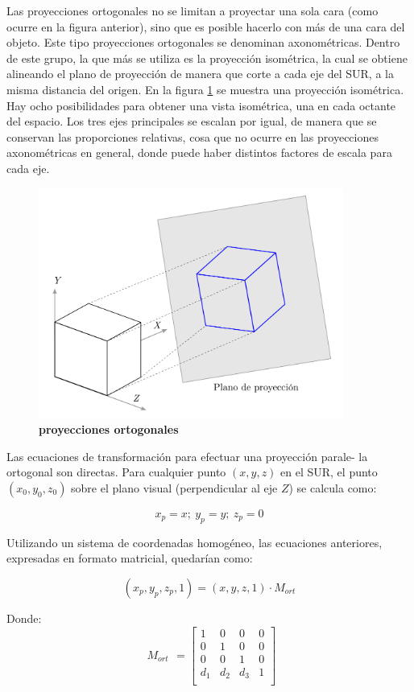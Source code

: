 Las proyecciones ortogonales no se limitan a proyectar una sola cara (como ocurre en la figura anterior), sino que es posible hacerlo con más de una cara del objeto. Este tipo proyecciones ortogonales se denominan axonométricas. Dentro de este grupo, la que más se utiliza es la proyección isométrica, la cual se obtiene alineando el plano de proyección de manera que corte a cada eje del SUR, a la misma distancia del origen. En la figura \ref{geo-per4} se muestra una proyección isométrica. Hay ocho posibilidades para obtener una vista isométrica, una en cada octante del espacio. Los tres ejes principales se escalan por igual, de manera que se conservan las proporciones relativas, cosa que no ocurre en las proyecciones axonométricas en general, donde puede haber distintos factores de escala para cada eje.
\begin{figure}[h]
    \includegraphics[width=10cm]{Img/GEO/geo-per-4.png}
    \centering
    \caption{\footnotesize{\textbf{proyecciones ortogonales}}}
    \label{geo-per4}
\end{figure}

Las ecuaciones de transformación para efectuar una proyección parale- la ortogonal son directas. Para cualquier punto $(x, y, z)$ en el SUR, el punto $(x_0, y_0, z_0)$ sobre el plano visual (perpendicular al eje $Z$) se calcula como:

$$x_p = x; \ y_p = y; \ z_p=0$$

Utilizando un sistema de coordenadas homogéneo, las ecuaciones anteriores, expresadas en formato matricial, quedarían como:

$$(x_p, y_p, z_p, 1)=(x, y, z, 1) \cdot M_{ort}$$

Donde:
\begin{equation}
\begin{array}{rccl}
M_{ort}
\end{array}
=
\left[
\begin{array}{rccl}
1 & 0 & 0 & 0\\
0 & 1 & 0 & 0\\
0 & 0 & 1 & 0\\
d_{1} & d_{2} & d_{3} & 1\\
\end{array}
\right]
\end{equation}


